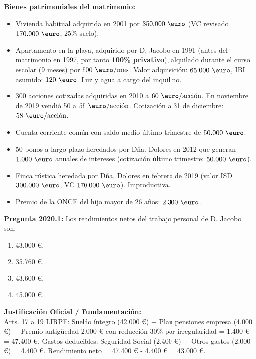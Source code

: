\documentclass[11pt,a4paper,openany]{article}
\begin{document}
\begin{enunciadoBox}
\textbf{Bienes patrimoniales del matrimonio:}
\begin{itemize}[itemsep=1.5pt]
    \item Vivienda habitual adquirida en 2001 por $350.000\text{ \euro}$ (VC revisado $170.000\text{ \euro}$, $25\%$ suelo).
    \item Apartamento en la playa, adquirido por D. Jacobo en 1991 (antes del matrimonio en 1997, por tanto \textbf{100\% privativo}), alquilado durante el curso escolar (9 meses) por $500\text{ \euro/mes}$. Valor adquisición: $65.000\text{ \euro}$, IBI asumido: $120\text{ \euro}$. Luz y agua a cargo del inquilino.
    \item 300 acciones cotizadas adquiridas en 2010 a $60\text{ \euro/acción}$. En noviembre de 2019 vendió 50 a $55\text{ \euro/acción}$. Cotización a 31 de diciembre: $58\text{ \euro/acción}$.
    \item Cuenta corriente común con saldo medio último trimestre de $50.000\text{ \euro}$.
    \item 50 bonos a largo plazo heredados por Dña. Dolores en 2012 que generan $1.000\text{ \euro}$ anuales de intereses (cotización último trimestre: $50.000\text{ \euro}$).
    \item Finca rústica heredada por Dña. Dolores en febrero de 2019 (valor ISD $300.000\text{ \euro}$, VC $170.000\text{ \euro}$). Improductiva.
    \item Premio de la ONCE del hijo mayor de 26 años: $2.300\text{ \euro}$.
\end{itemize}
\end{enunciadoBox}

\vspace{0.4cm}

\noindent\textbf{\sffamily Pregunta 2020.1:} Los rendimientos netos del trabajo personal de D. Jacobo son:\\[0.15cm]
\begin{enumerate}[label=\textbf{\alph*)},leftmargin=1.8em,itemsep=1.5pt,topsep=2pt,partopsep=0pt,parsep=0pt]
    \item 43.000 \euro{}.
    \item 35.760 \euro{}.
    \item 43.600 \euro{}.
    \item 45.000 \euro{}.
\end{enumerate}
\begin{solucionBox}
\textbf{Justificación Oficial / Fundamentación:}\\[0.1cm]
Arts. 17 a 19 LIRPF: Sueldo íntegro (42.000 \euro{}) + Plan pensiones empresa (4.000 \euro{}) + Premio antigüedad 2.000 \euro{} con reducción 30\% por irregularidad = 1.400 \euro{} = 47.400 \euro{}. Gastos deducibles: Seguridad Social (2.400 \euro{}) + Otros gastos (2.000 \euro{}) = 4.400 \euro{}. Rendimiento neto = 47.400 \euro{} - 4.400 \euro{} = 43.000 \euro{}.
\end{solucionBox}
\vspace{0.35cm}
\end{document}
